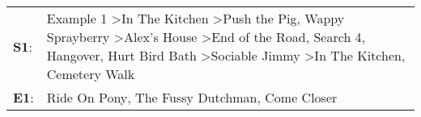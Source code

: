 \begin{supertabular}{p{0.03\textwidth}p{0.92\textwidth}}
 \textbf{S1}:  &  Example 1\textsuperscript{} \textgreater \enspace In The Kitchen\textsuperscript{} \textgreater \enspace Push the Pig\textsuperscript{}, \enspace Wappy Sprayberry\textsuperscript{} \textgreater \enspace Alex's House\textsuperscript{} \textgreater \enspace End of the Road\textsuperscript{}, \enspace Search 4\textsuperscript{}, \enspace Hangover\textsuperscript{}, \enspace Hurt Bird Bath\textsuperscript{} \textgreater \enspace Sociable Jimmy\textsuperscript{} \textgreater \enspace In The Kitchen\textsuperscript{}, \enspace Cemetery Walk\textsuperscript{}  \enspace  \\
 \textbf{E1}:  &                                                                                                                                                                                                                                                                                                                                                                                                                                                           Ride On Pony\textsuperscript{}, \enspace The Fussy Dutchman\textsuperscript{}, \enspace Come Closer\textsuperscript{}  \enspace  \\
\end{supertabular}
